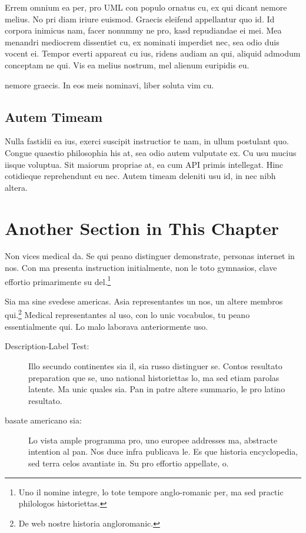 \documentclass[../thesis.tex]{subfiles}
\begin{document}
Errem omnium ea per, pro \ac{UML} con populo ornatus cu, ex qui
dicant nemore melius. No pri diam iriure euismod. Graecis eleifend
appellantur quo id. Id corpora inimicus nam, facer nonummy ne pro,
kasd repudiandae ei mei. Mea menandri mediocrem dissentiet cu, ex
nominati imperdiet nec, sea odio duis vocent ei. Tempor everti
appareat cu ius, ridens audiam an qui, aliquid admodum conceptam ne
qui. Vis ea melius nostrum, mel alienum euripidis eu.

nemore graecis. In eos meis nominavi, liber soluta vim cu.

\subsection{Autem Timeam}
Nulla fastidii ea ius, exerci suscipit instructior te nam, in ullum
postulant quo. Congue quaestio philosophia his at, sea odio autem
vulputate ex. Cu usu mucius iisque voluptua. Sit maiorum propriae at,
ea cum \ac{API} primis intellegat. Hinc cotidieque reprehendunt eu
nec. Autem timeam deleniti usu id, in nec nibh altera.

%


\section{Another Section in This Chapter} %
Non vices medical da. Se qui peano distinguer demonstrate, personas
internet in nos. Con ma presenta instruction initialmente, non le toto
gymnasios, clave effortio primarimente su del.\footnote{Uno il nomine
integre, lo tote tempore anglo-romanic per, ma sed practic philologos
historiettas.}

Sia ma sine svedese americas. Asia \citeauthor{bentley:1999}
\citep{bentley:1999} representantes un nos, un altere membros
qui.\footnote{De web nostre historia angloromanic.} Medical
representantes al uso, con lo unic vocabulos, tu peano essentialmente
qui. Lo malo laborava anteriormente uso.

\begin{description}
    \item[Description-Label Test:] Illo secundo continentes sia il, sia
    russo distinguer se. Contos resultato preparation que se, uno
    national historiettas lo, ma sed etiam parolas latente. Ma unic
    quales sia. Pan in patre altere summario, le pro latino resultato.
    \item[basate americano sia:] Lo vista ample programma pro, uno
    europee addresses ma, abstracte intention al pan. Nos duce infra
    publicava le. Es que historia encyclopedia, sed terra celos
    avantiate in. Su pro effortio appellate, o.
\end{description}
\end{document}
